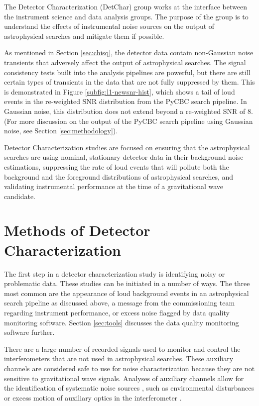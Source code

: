 The Detector Characterization (DetChar) group works at the interface 
between the instrument science and data analysis groups. 
The purpose of 
the group is to understand the effects of instrumental noise sources on 
the output of astrophysical searches and mitigate them if possible.

As mentioned in Section \ref{sec:chisq}, the detector data contain 
non-Gaussian noise transients that adversely affect the output of 
astrophysical searches. The signal consistency tests built into the 
analysis pipelines are powerful, but there are still 
certain types of transients in the data that are not fully suppressed 
by them. This is demonstrated in Figure \ref{subfig:l1-newsnr-hist}, which shows a 
tail of loud events in the re-weighted SNR distribution from the PyCBC 
search pipeline. In Gaussian noise, this distribution does not extend beyond 
a re-weighted SNR of 8. (For more discussion on the output of the PyCBC search 
pipeline using Gaussian noise, see Section \ref{sec:methodology}).

Detector Characterization studies are focused on ensuring that the
astrophysical searches are using nominal, stationary
detector data in their background noise estimations, suppressing the 
rate of loud events that will pollute both the background and the foreground 
distributions of astrophysical searches, and validating instrumental 
performance at the time of a gravitational wave candidate.

\section{Methods of Detector Characterization}

The first step in a detector characterization study is identifying 
noisy or problematic data. These studies can be initiated in a number of ways. 
The three most common are the appearance of 
loud background events in an astrophysical search pipeline as discussed above, 
a message from 
the commissioning team regarding instrument performance, or excess noise 
flagged by data quality monitoring software. Section \ref{sec:tools} discusses 
the data quality monitoring software further.

There are a large number of recorded signals used to monitor and control the
interferometers that are not used in astrophysical searches. These auxiliary
channels are considered safe to use for noise characterization because they are
not sensitive to gravitational wave signals. Analyses of auxiliary channels
allow for the identification of systematic noise sources \cite{Smith:2011,Isogai:2010},
such as environmental
disturbances \cite{Effler:2014zpa} or excess motion of auxiliary optics in the
interferometer \cite{GW150914-DETECTORS,InstrumentNoisePaper}. 


